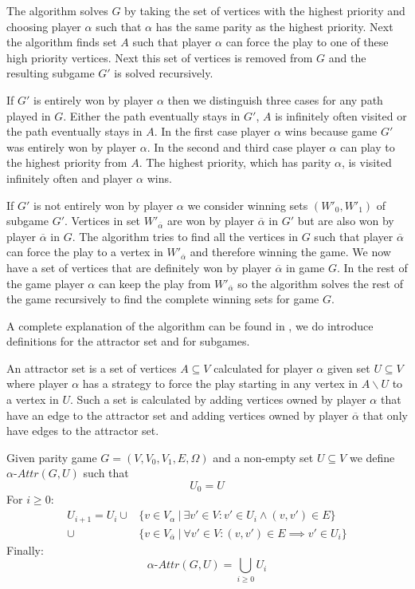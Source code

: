 The algorithm solves $G$ by taking the set of vertices with the highest priority and choosing player $\alpha$ such that $\alpha$ has the same parity as the highest priority. Next the algorithm finds set $A$ such that player $\alpha$ can force the play to one of these high priority vertices. Next this set of vertices is removed from $G$ and the resulting subgame $G'$ is solved recursively. 

If $G'$ is entirely won by player $\alpha$ then we distinguish three cases for any path played in $G$. Either the path eventually stays in $G'$, $A$ is infinitely often visited or the path eventually stays in $A$. In the first case player $\alpha$ wins because game $G'$ was entirely won by player $\alpha$. In the second and third case player $\alpha$ can play to the highest priority from $A$. The highest priority, which has parity $\alpha$, is visited infinitely often and player $\alpha$ wins.

If $G'$ is not entirely won by player $\alpha$ we consider winning sets $(W'_0,W'_1)$ of subgame $G'$. Vertices in set $W'_{\overline{\alpha}}$ are won by player $\overline{\alpha}$ in $G'$ but are also won by player $\overline{\alpha}$ in $G$. The algorithm tries to find all the vertices in $G$ such that player $\overline{\alpha}$ can force the play to a vertex in $W'_{\overline{\alpha}}$ and therefore winning the game. We now have a set of vertices that are definitely won by player $\overline{\alpha}$ in game $G$. In the rest of the game player $\alpha$ can keep the play from $W'_{\overline{\alpha}}$ so the algorithm solves the rest of the game recursively to find the complete winning sets for game $G$.

A complete explanation of the algorithm can be found in \cite{ZIELONKA1998135}, we do introduce definitions for the attractor set and for subgames. 

An attractor set is a set of vertices $A \subseteq V$ calculated for player $\alpha$ given set $U \subseteq V$ where player $\alpha$ has a strategy to force the play starting in any vertex in $A \backslash U$ to a vertex in $U$. Such a set is calculated by adding vertices owned by player $\alpha$ that have an edge to the attractor set and adding vertices owned by player $\overline{\alpha}$ that only have edges to the attractor set.

\begin{definition}
	\label{def_attr}Given parity game $G = (V,V_0,V_1,E,\Omega)$ and a non-empty set $U \subseteq V$ we define $\alpha\textit{-Attr}(G,U)$ such that
	\[U_0 = U \]
	For $i \geq 0$:
	\begin{align*}
	U_{i+1} = U_i\cup
	&\{v \in V_\alpha\ |\ \exists v' \in V : v' \in U_i \wedge (v,v') \in E \}\\
	\cup &\{v \in V_{\overline{\alpha}}\ |\ \forall v' \in V :(v,v') \in E \implies v' \in U_i \}
	\end{align*}
	Finally:
	\[\alpha\textit{-Attr}(G,U) = \bigcup_{i \geq 0} U_i \]
\end{definition}

